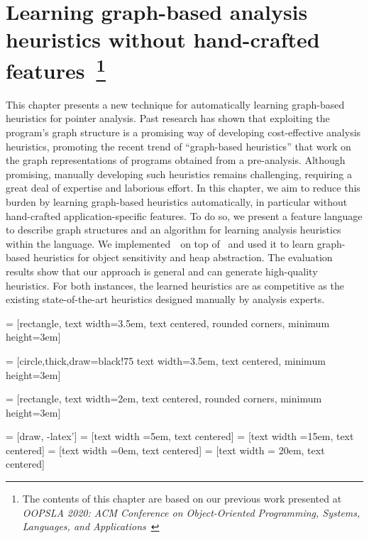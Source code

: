 \chapter{Learning graph-based analysis heuristics without hand-crafted features~\footnote{The contents of this chapter are based on our previous work presented at \emph{OOPSLA 2020: ACM Conference on Object-Oriented Programming, Systems, Languages, and Applications}~\cite{Graphick20}}}\label{sec:Graphick}


This chapter presents a new technique for automatically learning graph-based heuristics for pointer analysis.
Past research has shown that exploiting the program's graph structure is a promising way of developing cost-effective analysis heuristics, promoting the recent trend of ``graph-based heuristics'' that work on the graph representations of programs obtained from a  pre-analysis. 
Although promising, manually developing such heuristics remains challenging, requiring a great deal of expertise and laborious effort.
In this chapter, we aim to reduce this burden by learning graph-based heuristics automatically, in particular without hand-crafted application-specific features. To do so, we present a feature language to describe graph structures and an algorithm for learning analysis heuristics within the language.
We implemented~\ourtool~on top of \Doop~and used it to learn graph-based heuristics for object sensitivity and heap abstraction.
The evaluation results show that our approach is general and can generate high-quality heuristics. For both instances,
the learned heuristics are as competitive as the existing state-of-the-art heuristics designed manually by analysis experts.







 = [rectangle,   text width=3.5em, text
centered, rounded corners, minimum height=3em]



 = [circle,thick,draw=black!75   text width=3.5em, text
centered, minimum height=3em]


 = [rectangle,   text width=2em, text
centered, rounded corners, minimum height=3em]

 = [draw, -latex']
 = [text width =5em, text centered]
 = [text width =15em, text centered]
 = [text width =0em, text centered]
 = [text width = 20em, text centered]


